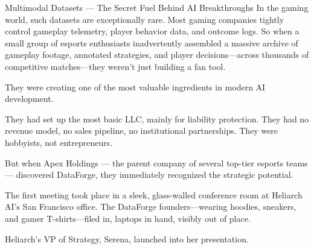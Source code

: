 \begin{HistoricalSidebar}{Multimodal Datasets --- The Secret Fuel Behind AI Breakthroughs}
    In the gaming world, such datasets are exceptionally rare. Most gaming companies tightly control gameplay telemetry, player behavior data, and outcome logs. So when a small group of esports enthusiasts inadvertently assembled a massive archive of gameplay footage, annotated strategies, and player decisions—across thousands of competitive matches—they weren’t just building a fan tool.

    \medskip
    
    They were creating one of the most valuable ingredients in modern AI development.
    
\end{HistoricalSidebar}

\medskip

They had set up the most basic LLC, mainly for liability protection.  
They had no revenue model, no sales pipeline, no institutional partnerships.  
They were hobbyists, not entrepreneurs.

But when Apex Holdings — the parent company of several top-tier esports teams — discovered DataForge, they immediately recognized the strategic potential.

The first meeting took place in a sleek, glass-walled conference room at Heliarch AI’s San Francisco office. The DataForge founders—wearing hoodies, sneakers, and gamer T-shirts—filed in, laptops in hand, visibly out of place.  

Heliarch’s VP of Strategy, Serena, launched into her presentation.

\medskip

